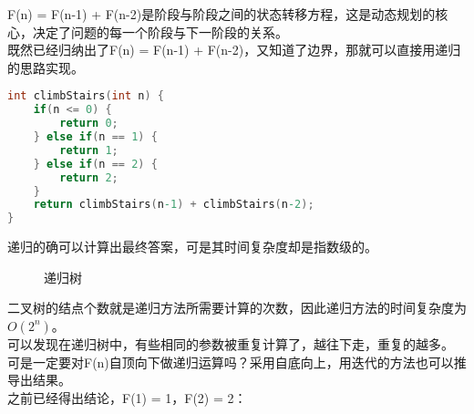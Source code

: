 F(n) = F(n-1) + F(n-2)是阶段与阶段之间的状态转移方程，这是动态规划的核心，决定了问题的每一个阶段与下一阶段的关系。\\

既然已经归纳出了F(n) = F(n-1) + F(n-2)，又知道了边界，那就可以直接用递归的思路实现。\\


\begin{lstlisting}[language=C]
int climbStairs(int n) {
    if(n <= 0) {
        return 0;
    } else if(n == 1) {
        return 1;
    } else if(n == 2) {
        return 2;
    }
    return climbStairs(n-1) + climbStairs(n-2);
}
\end{lstlisting}

递归的确可以计算出最终答案，可是其时间复杂度却是指数级的。

\begin{figure}[H]
	\centering
	\caption{递归树}
\end{figure}

二叉树的结点个数就是递归方法所需要计算的次数，因此递归方法的时间复杂度为$ O(2^n) $。\\

可以发现在递归树中，有些相同的参数被重复计算了，越往下走，重复的越多。\\

可是一定要对F(n)自顶向下做递归运算吗？采用自底向上，用迭代的方法也可以推导出结果。\\

之前已经得出结论，F(1) = 1，F(2) = 2：

\begin{table}[H]
	\centering
\end{table}

